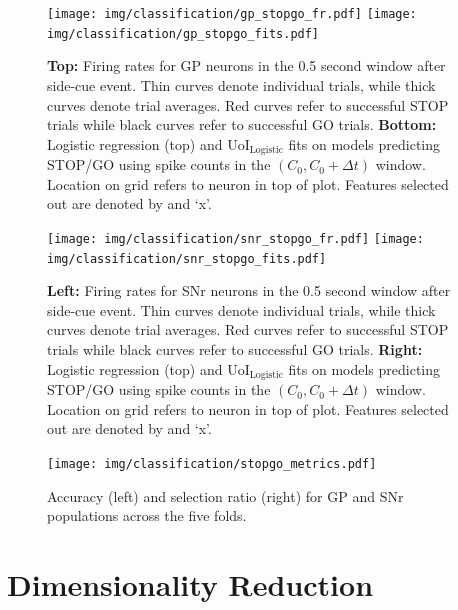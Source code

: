 \documentclass[11pt]{article}
\begin{document}
\begin{figure}[H]
	\centering
	\texttt{[image: img/classification/gp\_stopgo\_fr.pdf]}
	\texttt{[image: img/classification/gp\_stopgo\_fits.pdf]}
	\caption{\textbf{Top:} Firing rates for GP neurons in the 0.5 second window after side-cue event. Thin curves denote individual trials, while thick curves denote trial averages. Red curves refer to successful STOP trials while black curves refer to successful GO trials. \textbf{Bottom:} Logistic regression (top) and UoI$_{\text{Logistic}}$ fits on models predicting STOP/GO using spike counts in the $(C_0, C_0+\Delta t)$ window. Location on grid refers to neuron in top of plot. Features selected out are denoted by and `x'.}
	\label{fig:gp_stopgo}
\end{figure}

\begin{figure}[H]
	\centering
	\texttt{[image: img/classification/snr\_stopgo\_fr.pdf]}
	\texttt{[image: img/classification/snr\_stopgo\_fits.pdf]}
	\caption{\textbf{Left:} Firing rates for SNr neurons in the 0.5 second window after side-cue event. Thin curves denote individual trials, while thick curves denote trial averages. Red curves refer to successful STOP trials while black curves refer to successful GO trials. \textbf{Right:} Logistic regression (top) and UoI$_{\text{Logistic}}$ fits on models predicting STOP/GO using spike counts in the $(C_0, C_0+\Delta t)$ window. Location on grid refers to neuron in top of plot. Features selected out are denoted by and `x'.}
	\label{fig:snr_stopgo}
\end{figure}
\begin{figure}[H]
	\centering
	\texttt{[image: img/classification/stopgo\_metrics.pdf]}
	\caption{Accuracy (left) and selection ratio (right) for GP and SNr populations across the five folds.}
	\label{fig:stopgo_metrics}
\end{figure}

\section{Dimensionality Reduction}
\end{document}
